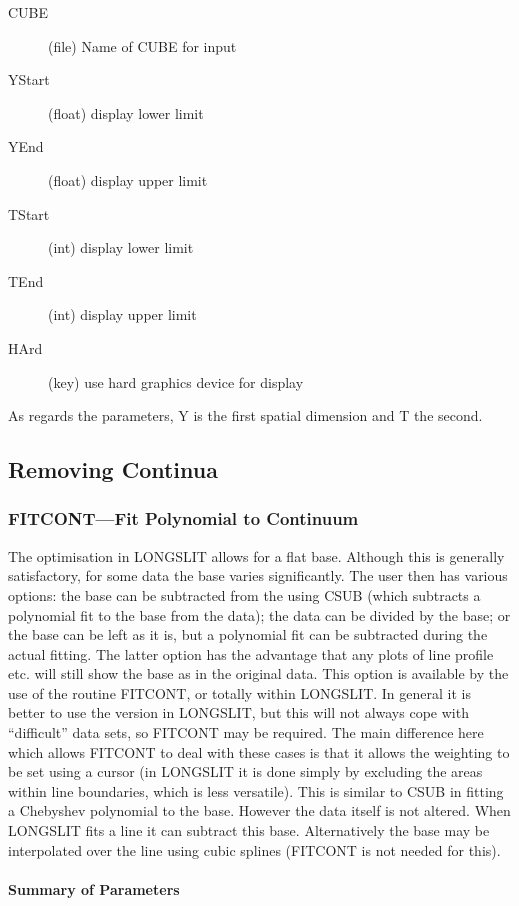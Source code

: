 \documentclass[11pt,twoside]{article}
\newcommand{\xlabel}[1]{}
\begin{document}
\begin{description}
\item[CUBE] (file) Name of CUBE for input
\item[YStart] (float) display lower limit
\item[YEnd] (float) display upper limit
\item[TStart] (int) display lower limit
\item[TEnd] (int) display upper limit
\item[HArd] (key) use hard graphics device for display
\end{description}
As regards the parameters, Y is the first spatial dimension and T the
second.

\subsection{\xlabel{removing_continua}\label{removing_continua}Removing Continua}
\subsubsection{\xlabel{fitcontfit_polynomial_to_continuum}FITCONT---Fit Polynomial to Continuum}

The optimisation in LONGSLIT allows for a flat base.
Although this is generally satisfactory, for some data the base varies
significantly.
The user then has various options: the base can be subtracted from the
using CSUB (which subtracts a polynomial fit to the base from the
data); the data can be divided by the base; or the base can be left as
it is, but a polynomial fit can be subtracted during the actual fitting.
The latter option has the advantage that any plots of line profile etc.
will still show the base as in the original data.
This option is available by the use of the routine FITCONT, or totally
within LONGSLIT.
In general it is better to use the version in LONGSLIT, but this will
not always cope with ``difficult'' data sets, so FITCONT may be
required.
The main difference here which allows FITCONT to deal with these cases
is that it allows the weighting to be set using a cursor (in LONGSLIT it
is done simply by excluding the areas within line boundaries, which is
less versatile).
This is similar to CSUB in fitting a Chebyshev polynomial to the base.
However the data itself is not altered.
When LONGSLIT fits a line it can subtract this base.
Alternatively the base may be interpolated over the line using cubic
splines (FITCONT is not needed for this).

\paragraph{Summary of Parameters}
\end{document}
